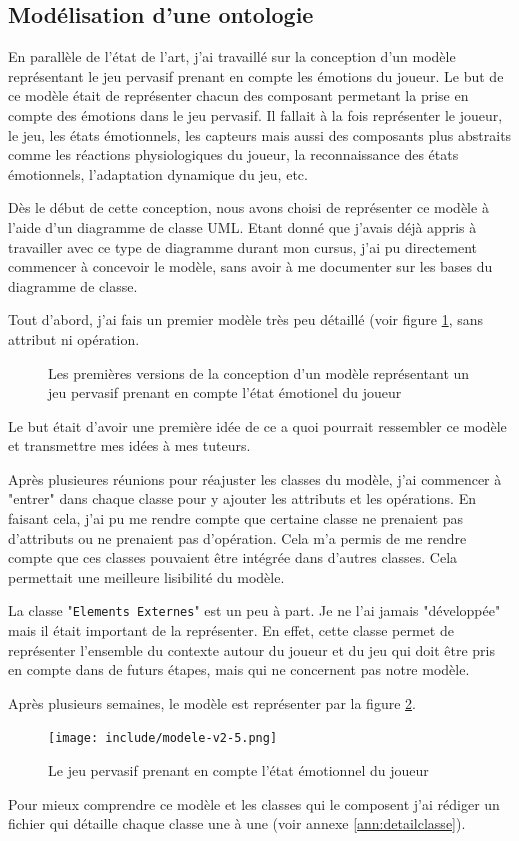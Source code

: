 \documentclass{article}
\begin{document}
	\subsection{Modélisation d'une ontologie}
		En parallèle de l'état de l'art, j'ai travaillé sur la conception d'un modèle représentant le jeu pervasif prenant en compte les émotions du joueur. 
		Le but de ce modèle était de représenter chacun des composant permetant la prise en compte des émotions dans le jeu pervasif. 
		Il fallait à la fois représenter le joueur, le jeu, les états émotionnels, les capteurs mais aussi des composants plus abstraits comme les réactions physiologiques du joueur, la reconnaissance des états émotionnels, l'adaptation dynamique du jeu, etc.\par
		Dès le début de cette conception, nous avons choisi de représenter ce modèle à l'aide d'un diagramme de classe UML. 
		Etant donné que j'avais déjà appris à travailler avec ce type de diagramme durant mon cursus, j'ai pu directement commencer à concevoir le modèle, sans avoir à me documenter sur les bases du diagramme de classe.\par
		Tout d'abord, j'ai fais un premier modèle très peu détaillé (voir figure \ref{fig:premmodele}, sans attribut ni opération.
		\begin{figure}
			\caption{Les premières versions de la conception d'un modèle représentant un jeu pervasif prenant en compte l'état émotionel du joueur}
			\label{fig:premmodele}
		\end{figure}
		Le but était d'avoir une première idée de ce a quoi pourrait ressembler ce modèle et transmettre mes idées à mes tuteurs.\par
		Après plusieures réunions pour réajuster les classes du modèle, j'ai commencer à "entrer" dans chaque classe pour y ajouter les attributs et les opérations. 
		En faisant cela, j'ai pu me rendre compte que certaine classe ne prenaient pas d'attributs ou ne prenaient pas d'opération.
		Cela m'a permis de me rendre compte que ces classes pouvaient être intégrée dans d'autres classes.
		Cela permettait une meilleure lisibilité du modèle.\par
		La classe  "\texttt{Elements Externes}" est un peu à part. Je ne l'ai jamais "développée" mais il était important de la représenter.
		En effet, cette classe permet de représenter l'ensemble du contexte autour du joueur et du jeu qui doit être pris en compte dans de futurs étapes, mais qui ne concernent pas notre modèle.\par
		Après plusieurs semaines, le modèle est représenter par la figure \ref{fig:modele}.
		\begin{figure}
			\texttt{[image: include/modele-v2-5.png]}
			\caption{Le jeu pervasif prenant en compte l'état émotionnel du joueur}
			\label{fig:modele}
		\end{figure}
		Pour mieux comprendre ce modèle et les classes qui le composent j'ai rédiger un fichier qui détaille chaque classe une à une (voir annexe \ref{ann:detailclasse}).
\end{document}
